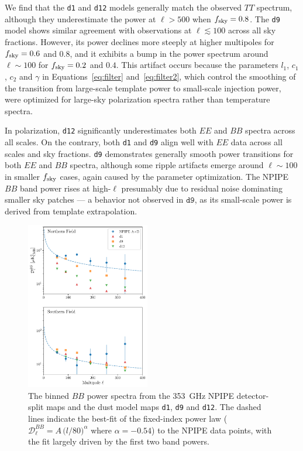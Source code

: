 \documentclass[twocolumn]{aastex631}
\begin{document}
We find that the \texttt{d1} and \texttt{d12} models generally match the observed $TT$ spectrum, although they underestimate the power at $\ell > 500$ when $f_{\rm sky} = 0.8$. The \texttt{d9} model shows similar agreement with observations at $\ell \lesssim 100$ across all sky fractions. However, its power declines more steeply at higher multipoles for $f_{\rm sky} = 0.6$ and $0.8$, and it exhibits a bump in the power spectrum around $\ell \sim 100$ for $f_{\rm sky} = 0.2$ and $0.4$. This artifact occurs because the parameters $l_1$, $c_1$, $c_2$ and $\gamma$ in Equations~\eqref{eq:filter} and~\eqref{eq:filter2}, which control the smoothing of the transition from large-scale template power to small-scale injection power, were optimized for large-sky polarization spectra rather than temperature spectra. 

In polarization, \texttt{d12} significantly underestimates both $EE$ and $BB$ spectra across all scales. On the contrary, both \texttt{d1} and \texttt{d9} align well with $EE$ data across all scales and sky fractions. \texttt{d9} demonstrates generally smooth power transitions for both $EE$ and $BB$ spectra, although some ripple artifacts emerge around $\ell \sim 100$ in smaller $f_{\rm sky}$ cases, again caused by the parameter optimization. The NPIPE $BB$ band power rises at high-$\ell$ presumably due to residual noise dominating smaller sky patches --- a behavior not observed in $\texttt{d9}$, as its small-scale power is derived from template extrapolation. 

\begin{figure}
    \centering
    \includegraphics[width=0.48\textwidth]{figures/smallfield_power.pdf}
    \caption{The binned $BB$ power spectra from the 353~GHz NPIPE detector-split maps and the dust model maps \texttt{d1}, \texttt{d9} and \texttt{d12}. The dashed lines indicate the best-fit of the fixed-index power law ($\mathcal{D}_\ell^{BB} = A \, \big( l/80 \big)^{\alpha}$ where $\alpha = -0.54$) to the NPIPE data points, with the fit largely driven by the first two band powers.}
    \label{fig:smallfield_power}
\end{figure}
\end{document}
